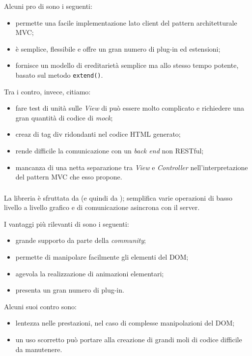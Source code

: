 Alcuni pro di \backbonejs{} sono i seguenti:
\begin{itemize}
	\item permette una facile implementazione lato client del pattern architetturale MVC;
	\item \`e semplice, flessibile e offre un gran numero di plug-in ed estensioni;
	\item fornisce un modello di ereditarietà semplice ma allo stesso tempo potente, basato sul metodo \texttt{extend()}.
\end{itemize}
Tra i contro, invece, citiamo:
\begin{itemize}
	\item fare test di unità sulle \emph{View} di \backbonejs{} può essere molto complicato e richiedere una gran quantità di codice di \emph{mock};
	\item creaz di tag div ridondanti nel codice HTML generato;
	\item rende difficile la comunicazione con un \emph{back end} non RESTful;
	\item mancanza di una netta separazione tra \emph{View} e \emph{Controller} nell'interpretazione del pattern MVC che esso propone.
\end{itemize}


\subsubsection{\jquery}
La libreria \jquery{} è sfruttata da \backbonejs{} (e quindi da \jointjs); semplifica varie operazioni di basso livello a livello grafico e di comunicazione asincrona con il server.

I vantaggi più rilevanti di \jquery{} sono i seguenti:
\begin{itemize}
	\item grande supporto da parte della \emph{community};
	\item permette di manipolare facilmente gli elementi del DOM;
	\item agevola la realizzazione di animazioni elementari;
	\item presenta un gran numero di plug-in.
\end{itemize}
Alcuni suoi contro sono:
\begin{itemize}
	\item lentezza nelle prestazioni, nel caso di complesse manipolazioni del DOM;
	\item un uso scorretto può portare alla creazione di grandi moli di codice difficile da manutenere.
\end{itemize} 


